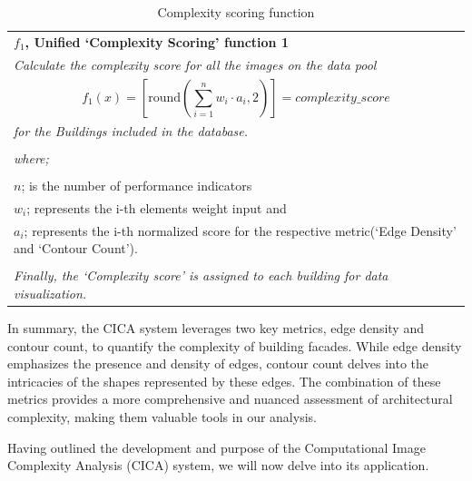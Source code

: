     \begin{table}[htb]
        \caption{Complexity scoring function }
        \label{tab:ComplexityScoreFunction_table}
        \centering
        \small
        \begin{tabular}{|p{8cm}|}
        \hline
            \textbf{\(f_1\), Unified `Complexity Scoring' function 1}\\
            \textit{Calculate the complexity score for all the images on the data pool}
            \\
            \begin{equation}
                f_1(x) = \left[ \mathrm{round}\left(\sum_{i=1}^{n} w_i \cdot a_i, 2\right) \right] = complexity\_score
            \label{eq:F1_ComplexityScoreFunction}
            \end{equation}

            \\
            \textit{ for the Buildings included in the database.}\\
            \\
            \textit{where;} \\
            \\
            \(n \); is the number of performance indicators \\
            \(w_i \); represents the i-th elements weight input and \\
            \(a_i \); represents the i-th normalized score for the respective metric(`Edge Density' and `Contour Count').\\
            \\

            \textit{Finally, the `Complexity score' is assigned to each building for data visualization.}\\
        \hline
        \end{tabular}
    \end{table}

In summary, the CICA system leverages two key metrics, edge density and contour count, to quantify the complexity of building facades.
While edge density emphasizes the presence and density of edges, contour count delves into the intricacies of the shapes represented by these edges.
The combination of these metrics provides a more comprehensive and nuanced assessment of architectural complexity, making them valuable tools in our analysis.

Having outlined the development and purpose of the Computational Image Complexity Analysis (CICA) system, we will now delve into its application.

